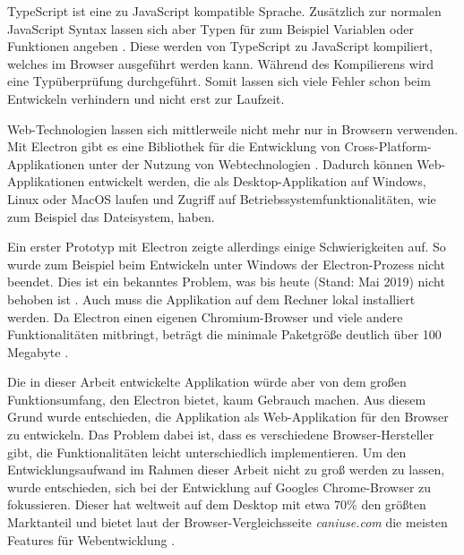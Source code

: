 TypeScript ist eine zu JavaScript kompatible Sprache. Zusätzlich zur normalen JavaScript Syntax lassen sich aber Typen für zum Beispiel Variablen oder Funktionen angeben \cite{typescript:mainpage}. Diese werden von TypeScript zu JavaScript kompiliert, welches im Browser ausgeführt werden kann. Während des Kompilierens wird eine Typüberprüfung durchgeführt. Somit lassen sich viele Fehler schon beim Entwickeln verhindern und nicht erst zur Laufzeit.

Web-Technologien lassen sich mittlerweile nicht mehr nur in Browsern verwenden. Mit Electron gibt es eine Bibliothek für die Entwicklung von Cross-Platform-Applikationen unter der Nutzung von Webtechnologien \cite{electron:about}. Dadurch können Web-Applikationen entwickelt werden, die als Desktop-Applikation auf Windows, Linux oder MacOS laufen und Zugriff auf Betriebssystemfunktionalitäten, wie zum Beispiel das Dateisystem, haben.

Ein erster Prototyp mit Electron zeigte allerdings einige Schwierigkeiten auf. So wurde zum Beispiel beim Entwickeln unter Windows der Electron-Prozess nicht beendet. Dies ist ein bekanntes Problem, was bis heute (Stand: Mai 2019) nicht behoben ist \cite{electron:processissue}. Auch muss die Applikation auf dem Rechner lokal installiert werden. Da Electron einen eigenen Chromium-Browser und viele andere Funktionalitäten mitbringt, beträgt die minimale Paketgröße deutlich über 100 Megabyte \cite{electron:sizeissue}.

Die in dieser Arbeit entwickelte Applikation würde aber von dem großen Funktionsumfang, den Electron bietet, kaum Gebrauch machen. Aus diesem Grund wurde entschieden, die Applikation als Web-Applikation für den Browser zu entwickeln. Das Problem dabei ist, dass es verschiedene Browser-Hersteller gibt, die Funktionalitäten leicht unterschiedlich implementieren. Um den Entwicklungsaufwand im Rahmen dieser Arbeit nicht zu groß werden zu lassen, wurde entschieden, sich bei der Entwicklung auf Googles Chrome-Browser zu fokussieren. Dieser hat weltweit auf dem Desktop mit etwa 70\% den größten Marktanteil \cite{statcounter:desktopbrowser} und bietet laut der Browser-Vergleichsseite \textit{caniuse.com} die meisten Features für Webentwicklung \cite{caniuse:home}.